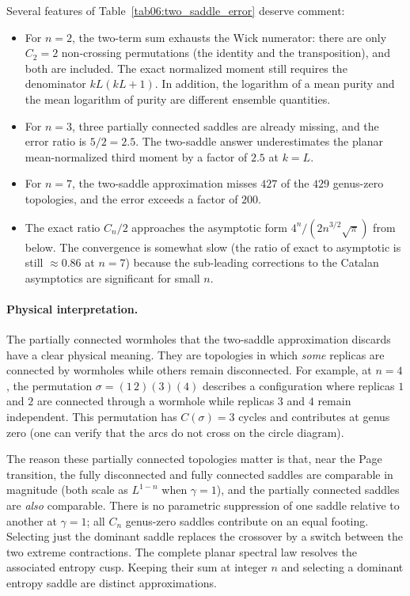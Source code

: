 \documentclass[11pt,letterpaper]{article}
\theoremstyle{plain}
\theoremstyle{definition}
\theoremstyle{remark}
\begin{document}
Several features of Table~\ref{tab06:two_saddle_error} deserve comment:
\begin{itemize}
\item For $n = 2$, the two-term sum exhausts the Wick numerator: there are only
  $C_2 = 2$ non-crossing permutations (the identity and the transposition), and
  both are included.  The exact normalized moment still requires the denominator $kL(kL+1)$.
  In addition, the logarithm of a mean purity and the mean logarithm of purity
  are different ensemble quantities.

\item For $n = 3$, three partially connected saddles are already missing, and the
  error ratio is $5/2 = 2.5$.  The two-saddle answer underestimates
  the planar mean-normalized third moment by a factor of $2.5$ at $k=L$.

\item For $n = 7$, the two-saddle approximation misses $427$ of the $429$
  genus-zero topologies, and the error exceeds a factor of $200$.

\item The exact ratio $C_n/2$ approaches the asymptotic form
  $4^n/(2n^{3/2}\sqrt{\pi})$ from below.  The convergence is somewhat slow
  (the ratio of exact to asymptotic is still $\approx 0.86$ at $n = 7$)
  because the sub-leading corrections to the Catalan asymptotics are
  significant for small $n$.
\end{itemize}

\paragraph{Physical interpretation.}
The partially connected wormholes that the two-saddle approximation
discards have a clear physical meaning.  They are topologies in which
\emph{some} replicas are connected by wormholes while others remain
disconnected.  For example, at $n = 4$, the permutation
$\sigma = (1\,2)(3)(4)$ describes a configuration where replicas $1$ and $2$
are connected through a wormhole while replicas $3$ and $4$ remain
independent.  This permutation has $C(\sigma) = 3$ cycles and contributes
at genus zero (one can verify that the arcs do not cross on the circle
diagram).

The reason these partially connected topologies matter is that, near the
Page transition, the fully disconnected and fully connected saddles are
comparable in magnitude (both scale as $L^{1-n}$ when $\gamma = 1$), and
the partially connected saddles are \emph{also} comparable.  There is no
parametric suppression of one saddle relative to another at $\gamma = 1$;
all $C_n$ genus-zero saddles contribute on an equal footing.  Selecting just the dominant saddle replaces the crossover by a switch
between the two extreme contractions.  The complete planar spectral law
resolves the associated entropy cusp.  Keeping their sum at integer $n$
and selecting a dominant entropy saddle are distinct approximations.
\end{document}
